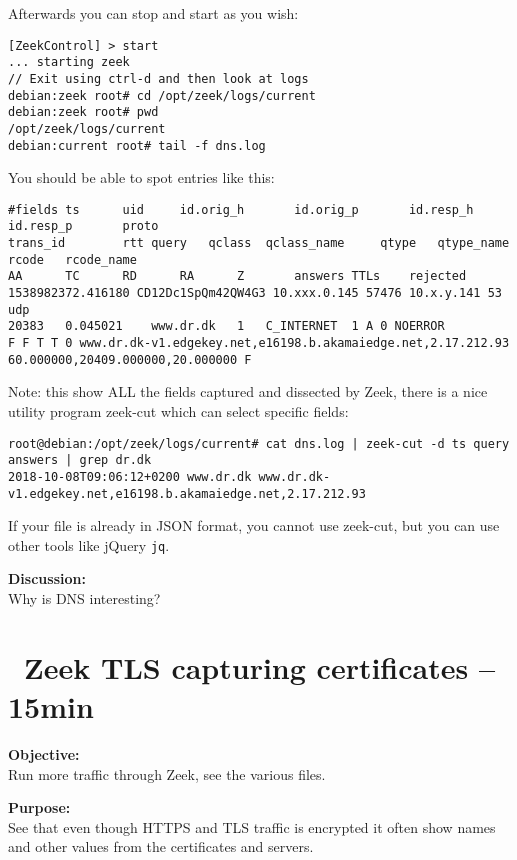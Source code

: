 \documentclass[a4paper,11pt,notitlepage]{report}
\begin{document}
Afterwards you can stop and start as you wish:
\begin{verbatim}
[ZeekControl] > start
... starting zeek
// Exit using ctrl-d and then look at logs
debian:zeek root# cd /opt/zeek/logs/current
debian:zeek root# pwd
/opt/zeek/logs/current
debian:current root# tail -f dns.log
\end{verbatim}

You should be able to spot entries like this:
\begin{verbatim}
#fields ts      uid     id.orig_h       id.orig_p       id.resp_h       id.resp_p       proto
trans_id        rtt query   qclass  qclass_name     qtype   qtype_name      rcode   rcode_name
AA      TC      RD      RA      Z       answers TTLs    rejected
1538982372.416180 CD12Dc1SpQm42QW4G3 10.xxx.0.145 57476 10.x.y.141 53	udp
20383	0.045021	www.dr.dk	1	C_INTERNET	1 A 0 NOERROR
F F T T 0 www.dr.dk-v1.edgekey.net,e16198.b.akamaiedge.net,2.17.212.93 60.000000,20409.000000,20.000000 F
\end{verbatim}

Note: this show ALL the fields captured and dissected by Zeek, there is a nice utility program zeek-cut which can select specific fields:

\begin{verbatim}
root@debian:/opt/zeek/logs/current# cat dns.log | zeek-cut -d ts query answers | grep dr.dk
2018-10-08T09:06:12+0200 www.dr.dk www.dr.dk-v1.edgekey.net,e16198.b.akamaiedge.net,2.17.212.93
\end{verbatim}

If your file is already in JSON format, you cannot use zeek-cut, but you can use other tools like jQuery \verb+jq+.

{\bf Discussion:}\\
Why is DNS interesting?


\chapter{\faExclamationTriangle\ Zeek TLS capturing certificates -- 15min}
\label{ex:zeektlsbasic}


{\bf Objective:} \\
Run more traffic through Zeek, see the various files.


{\bf Purpose:}\\
See that even though HTTPS and TLS traffic is encrypted it often show names and other values from the certificates and servers.
\end{document}
